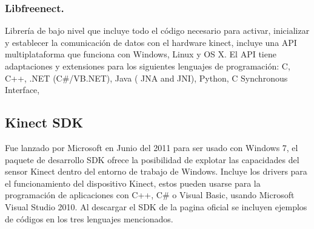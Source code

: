 \documentclass[11pt,a4paper]{article}
\begin{document}
\subsubsection{Libfreenect.}
Librería de bajo nivel que incluye todo el código necesario para activar, inicializar y establecer la comunicación de datos con el hardware kinect, incluye una API  multiplataforma que funciona con Windows, Linux  y OS X. El API tiene adaptaciones y extensiones para los siguientes lenguajes de programación: 
C, C++, .NET (C\#/VB.NET), Java ( JNA and JNI), Python, C Synchronous Interface,

\subsection{Kinect SDK}
Fue lanzado por Microsoft en Junio del 2011 para ser usado con Windows 7, el paquete de desarrollo SDK ofrece la posibilidad de explotar las capacidades del sensor Kinect dentro del entorno de trabajo de Windows. Incluye los \gls{driver}s para el funcionamiento del dispositivo Kinect, estos pueden usarse para la programación de aplicaciones con C++, C\# o Visual Basic, usando Microsoft Visual Studio 2010. Al descargar el SDK de la pagina oficial se incluyen ejemplos de códigos en los tres lenguajes mencionados.
\end{document}
